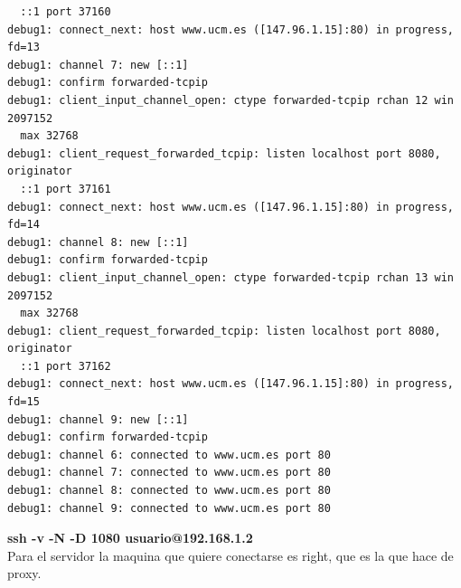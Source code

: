 \documentclass[11pt]{article}
\begin{document}
\begin{lstlisting}
  ::1 port 37160
debug1: connect_next: host www.ucm.es ([147.96.1.15]:80) in progress, fd=13
debug1: channel 7: new [::1]
debug1: confirm forwarded-tcpip
debug1: client_input_channel_open: ctype forwarded-tcpip rchan 12 win 2097152
  max 32768
debug1: client_request_forwarded_tcpip: listen localhost port 8080, originator
  ::1 port 37161
debug1: connect_next: host www.ucm.es ([147.96.1.15]:80) in progress, fd=14
debug1: channel 8: new [::1]
debug1: confirm forwarded-tcpip
debug1: client_input_channel_open: ctype forwarded-tcpip rchan 13 win 2097152
  max 32768
debug1: client_request_forwarded_tcpip: listen localhost port 8080, originator
  ::1 port 37162
debug1: connect_next: host www.ucm.es ([147.96.1.15]:80) in progress, fd=15
debug1: channel 9: new [::1]
debug1: confirm forwarded-tcpip
debug1: channel 6: connected to www.ucm.es port 80
debug1: channel 7: connected to www.ucm.es port 80
debug1: channel 8: connected to www.ucm.es port 80
debug1: channel 9: connected to www.ucm.es port 80
\end{lstlisting}

      \bigskip
      \par
      \textbf{ssh -v -N -D 1080 usuario@192.168.1.2}\\
      Para el servidor la maquina que quiere conectarse es right, que es la que
      hace de proxy.
\end{document}
